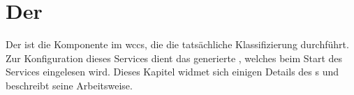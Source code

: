 \section{Der {\classificationService}}
    \label{section:solutionDetailsClassificationService}
    Der {\classificationService} ist die Komponente im \gls{wccs},
    die die tatsächliche Klassifizierung durchführt.
    Zur Konfiguration dieses Services dient das
    generierte {\classificationModel},
    welches beim Start des Services eingelesen wird.
    Dieses Kapitel widmet sich einigen Details des {\classificationService}s
    und beschreibt seine Arbeitsweise.

    
    
    
